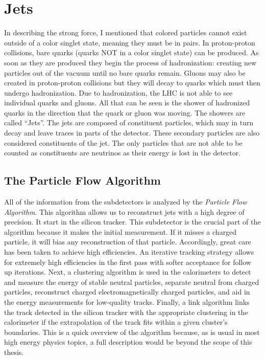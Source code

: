 \section{Jets}

In describing the strong force, I mentioned that colored particles cannot exist outside of a color singlet state, meaning they must be in pairs.
In proton-proton collisions, bare quarks (quarks NOT in a color singlet state) can be produced. As soon as they are produced they begin the process of hadronization: creating new particles out of the vacuum until no bare quarks remain.
Gluons may also be created in proton-proton collisions but they will decay to quarks which must then undergo hadronization.
Due to hadronization, the LHC is not able to see individual quarks and gluons. All that can be seen is the shower of hadronized quarks in the direction that the quark or gluon was moving.
The showers are called ``Jets''. The jets are composed of constituent particles, which may in turn decay and leave traces in parts of the detector. These secondary particles are also considered constituents of the jet.
The only particles that are not able to be counted as constituents are neutrinos as their energy is lost in the detector. 

\subsection{The Particle Flow Algorithm}
All of the information from the subdetectors is analyzed by the \textit{Particle Flow Algorithm}. This algorithm allows us to reconstruct jets with a high degree of precision.
It start in the silicon tracker. This subdetector is the crucial part of the algorithm because it makes the initial measurement. If it misses a charged particle, it will bias any reconstruction of that particle. 
Accordingly, great care has been taken to achieve high efficiencies. An iterative tracking strategy allows for extremely high efficiencies in the first pass with softer acceptance for follow up iterations. 
Next, a clustering algorithm is used in the calorimeters to detect and measure the energy of stable neutral particles, separate neutral from charged particles, reconstruct charged electromagnetically charged particles, and aid in the energy measurements for low-quality tracks.
Finally, a link algorithm links the track detected in the silicon tracker with the appropriate clustering in the calorimeter if the extrapolation of the track fits within a given cluster's boundaries.
This is a quick overview of the algorithm because, as is usual in most high energy physics topics, a full description would be beyond the scope of this thesis.

